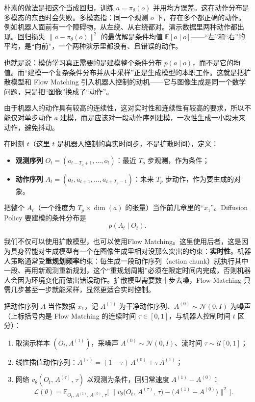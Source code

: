 朴素的做法是把这个当成回归，训练 $a = \pi_\theta(o)$ 并用均方误差。这在动作分布是多模态的东西时会失败。多模态指：同一个观测 $o$ 下，存在多个都正确的动作。例如机器人面前有一个障碍物，从左绕、从右绕都对。演示数据里两种动作都出现。回归损失 $\|a-\pi_\theta(o)\|^2$ 的最优解是条件均值 $\mathbb{E}[a\mid o]$——“左”和“右”的平均，是“向前”，一个两种演示里都没有、且错误的动作。

也就是说：模仿学习真正需要的是建模整个条件分布 $p(a\mid o)$，而不是它的均值。而“建模一个复杂条件分布并从中采样”正是生成模型的本职工作。这就是把扩散模型和 Flow Matching 引入机器人控制的动机——它与图像生成是同一个数学问题，只是把“图像”换成了“动作”。

由于机器人的动作具有较高的连续性，这对实时性和连续性有较高的要求，所以不能仅对单步动作 $a$ 建模，而是应该对一段动作序列建模，一次性生成一小段未来动作，避免抖动。

在时刻 $t$（这里 $t$ 是机器人控制的真实时间步，不是扩散时间），定义：
\begin{itemize}
\item \textbf{观测序列} $O_t = (o_{t-T_o+1}, \dots, o_t)$：最近 $T_o$ 步观测，作为条件；
\item \textbf{动作序列} $A_t = (a_t, a_{t+1}, \dots, a_{t+T_p-1})$：未来 $T_p$ 步动作，作为要生成的对象。
\end{itemize}
把整个 $A_t$（一个维度为 $T_p\times\dim(a)$ 的张量）当作前几章里的“$x_1$”。Diffusion Policy 要建模的条件分布是
\begin{equation}
p(A_t \mid O_t).
\end{equation}

我们不仅可以使用扩散模型，也可以使用Flow Matching。这里使用后者，这是因为具身智能对生成模型有一个在图像生成里相对没那么突出的约束：\textbf{实时性}。机器人策略通常受\textbf{重规划频率}约束：每生成一段动作序列（action chunk）就执行其中一段、再用新观测重新规划，这个“重规划周期”必须在限定时间内完成，否则机器人会因为环境变化而做出错误动作。扩散模型需要数十步去噪，Flow Matching 只需几步甚至一步就能采样，显然更适合实时控制。

把动作序列 $A$ 当作数据 $x_1$，记 $A^{(1)}$ 为干净动作序列、$A^{(0)}\sim\mathcal N(0,I)$ 为噪声（上标括号内是 Flow Matching 的连续时间 $\tau\in[0,1]$，与机器人控制时间 $t$ 区分）：
\begin{enumerate}
\item 取演示样本 $(O_t, A^{(1)})$，采噪声 $A^{(0)}\sim\mathcal N(0,I)$、流时间 $\tau\sim\mathcal U[0,1]$；
\item 线性插值动作序列：$A^{(\tau)} = (1-\tau)\,A^{(0)} + \tau\,A^{(1)}$；
\item 网络 $v_\theta(O_t,\, A^{(\tau)},\, \tau)$ 以观测为条件，回归常速度 $A^{(1)} - A^{(0)}$：
\begin{equation}\label{eq:fm_policy_loss}
\mathcal L(\theta) = \mathbb{E}_{O_t,\,A^{(1)},\,A^{(0)},\,\tau}
\Big[\,\big\| v_\theta\big(O_t,\, A^{(\tau)},\, \tau\big) - \big(A^{(1)} - A^{(0)}\big)\big\|^2\,\Big].
\end{equation}
\end{enumerate}


